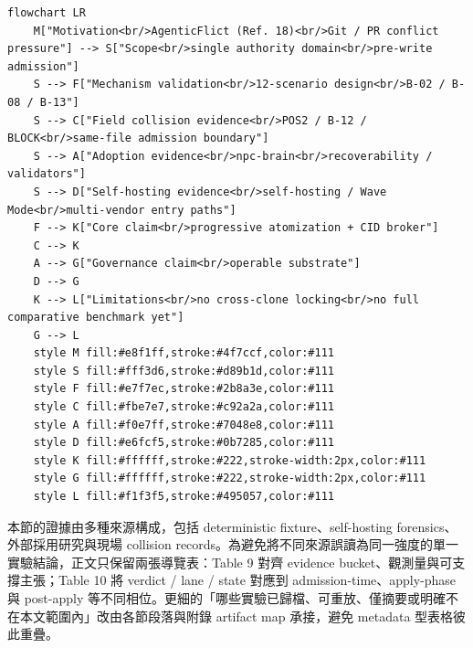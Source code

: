 \documentclass[a4paper,fontset=none]{ctexart}
\begin{document}
\begin{Verbatim}[breaklines=true,fontsize=\footnotesize]
flowchart LR
    M["Motivation<br/>AgenticFlict (Ref. 18)<br/>Git / PR conflict pressure"] --> S["Scope<br/>single authority domain<br/>pre-write admission"]
    S --> F["Mechanism validation<br/>12-scenario design<br/>B-02 / B-08 / B-13"]
    S --> C["Field collision evidence<br/>POS2 / B-12 / BLOCK<br/>same-file admission boundary"]
    S --> A["Adoption evidence<br/>npc-brain<br/>recoverability / validators"]
    S --> D["Self-hosting evidence<br/>self-hosting / Wave Mode<br/>multi-vendor entry paths"]
    F --> K["Core claim<br/>progressive atomization + CID broker"]
    C --> K
    A --> G["Governance claim<br/>operable substrate"]
    D --> G
    K --> L["Limitations<br/>no cross-clone locking<br/>no full comparative benchmark yet"]
    G --> L
    style M fill:#e8f1ff,stroke:#4f7ccf,color:#111
    style S fill:#fff3d6,stroke:#d89b1d,color:#111
    style F fill:#e7f7ec,stroke:#2b8a3e,color:#111
    style C fill:#fbe7e7,stroke:#c92a2a,color:#111
    style A fill:#f0e7ff,stroke:#7048e8,color:#111
    style D fill:#e6fcf5,stroke:#0b7285,color:#111
    style K fill:#ffffff,stroke:#222,stroke-width:2px,color:#111
    style G fill:#ffffff,stroke:#222,stroke-width:2px,color:#111
    style L fill:#f1f3f5,stroke:#495057,color:#111
\end{Verbatim}

本節的證據由多種來源構成，包括 deterministic fixture、self-hosting forensics、外部採用研究與現場 collision records。為避免將不同來源誤讀為同一強度的單一實驗結論，正文只保留兩張導覽表：Table 9 對齊 evidence bucket、觀測量與可支撐主張；Table 10 將 verdict / lane / state 對應到 admission-time、apply-phase 與 post-apply 等不同相位。更細的「哪些實驗已歸檔、可重放、僅摘要或明確不在本文範圍內」改由各節段落與附錄 artifact map 承接，避免 metadata 型表格彼此重疊。

\smallskip{}\par\smallskip
\end{document}
